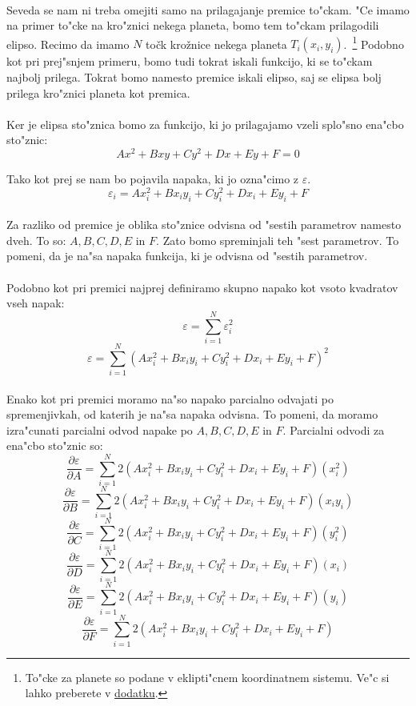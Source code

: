 \paragraph{}
Seveda se nam ni treba omejiti samo na prilagajanje premice to"ckam. "Ce imamo na primer to"cke na kro"znici nekega planeta, bomo tem to"ckam prilagodili elipso. Recimo da imamo $N$ točk krožnice nekega planeta $T_i(x_i, y_i)$.~\footnote{To"cke za planete so podane v eklipti"cnem koordinatnem sistemu. Ve"c si lahko preberete v \hyperref[eklipticni_sistem]{dodatku}.} Podobno kot pri prej"snjem primeru, bomo tudi tokrat iskali funkcijo, ki se to"ckam najbolj prilega. Tokrat bomo namesto premice iskali elipso, saj se elipsa bolj prilega kro"znici planeta kot premica.

\paragraph{}
Ker je elipsa sto"znica bomo za funkcijo, ki jo prilagajamo vzeli splo"sno ena"cbo sto"znic:
$$Ax^2 + Bxy + Cy^2 + Dx + Ey + F = 0$$

Tako kot prej se nam bo pojavila napaka, ki jo ozna"cimo z $\varepsilon$.
$$\varepsilon_i = Ax_i^2 + Bx_iy_i + Cy_i^2 + Dx_i + Ey_i + F$$

\paragraph{}
Za razliko od premice je oblika sto"znice odvisna od "sestih parametrov namesto dveh. To so: $A, B, C, D, E$ in $F$. Zato bomo spreminjali teh "sest parametrov. To pomeni, da je na"sa napaka funkcija, ki je odvisna od "sestih parametrov.

\paragraph{}
Podobno kot pri premici najprej definiramo skupno napako kot vsoto kvadratov vseh napak:
\[\varepsilon = \sum_{i=1}^{N}\varepsilon_i^2\]
\[\varepsilon = \sum_{i=1}^{N} (Ax_i^2 + Bx_iy_i + Cy_i^2 + Dx_i + Ey_i + F)^2\]

\paragraph{}
Enako kot pri premici moramo na"so napako parcialno odvajati po spremenjivkah, od katerih je na"sa napaka odvisna. To pomeni, da moramo izra"cunati parcialni odvod napake po $A, B, C, D, E$ in $F$. Parcialni odvodi za ena"cbo sto"znic so:
$$\frac{\partial \varepsilon}{\partial A} = \sum_{i=1}^{N}2(Ax_i^2 + Bx_iy_i + Cy_i^2 + Dx_i + Ey_i + F)(x_i^2)$$
$$\frac{\partial \varepsilon}{\partial B} = \sum_{i=1}^{N}2(Ax_i^2 + Bx_iy_i + Cy_i^2 + Dx_i + Ey_i + F)(x_iy_i)$$
$$\frac{\partial \varepsilon}{\partial C} = \sum_{i=1}^{N}2(Ax_i^2 + Bx_iy_i + Cy_i^2 + Dx_i + Ey_i + F)(y_i^2)$$
$$\frac{\partial \varepsilon}{\partial D} = \sum_{i=1}^{N}2(Ax_i^2 + Bx_iy_i + Cy_i^2 + Dx_i + Ey_i + F)(x_i)$$
$$\frac{\partial \varepsilon}{\partial E} = \sum_{i=1}^{N}2(Ax_i^2 + Bx_iy_i + Cy_i^2 + Dx_i + Ey_i + F)(y_i)$$
$$\frac{\partial \varepsilon}{\partial F} = \sum_{i=1}^{N}2(Ax_i^2 + Bx_iy_i + Cy_i^2 + Dx_i + Ey_i + F)$$

